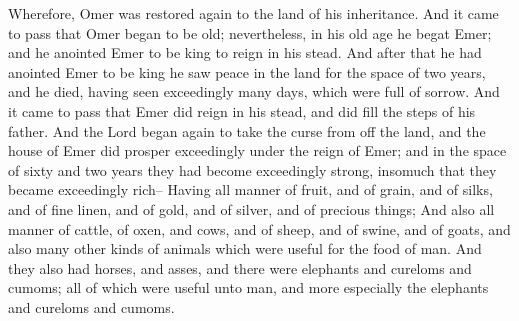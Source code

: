 \bverse \iffalse Wherefore, Omer was restored again to the land of his inheritance. \fi
Wherefore, Omer was restored again to the land of his inheritance.
\bverse \iffalse And it came to pass that Omer began to be old; nevertheless, in his old age he begat Emer; and he anointed Emer to be king to reign in his stead. \fi
And it came to pass that Omer began to be old; nevertheless, in his old age he begat Emer; and he anointed Emer to be king to reign in his stead.
\bverse \iffalse And after that he had anointed Emer to be king he saw peace in the land for the space of two years, and he died, having seen exceedingly many days, which were full of sorrow. And it came to pass that Emer did reign in his stead, and did fill the steps of his father. \fi
And after that he had anointed Emer to be king he saw peace in the land for the space of two years, and he died, having seen exceedingly many days, which were full of sorrow. And it came to pass that Emer did reign in his stead, and did fill the steps of his father.
\bverse \iffalse And the Lord began again to take the curse from off the land, and the house of Emer did prosper exceedingly under the reign of Emer; and in the space of sixty and two years they had become exceedingly strong, insomuch that they became exceedingly rich-- \fi
And the Lord began again to take the curse from off the land, and the house of Emer did prosper exceedingly under the reign of Emer; and in the space of sixty and two years they had become exceedingly strong, insomuch that they became exceedingly rich--
\bverse \iffalse Having all manner of fruit, and of grain, and of silks, and of fine linen, and of gold, and of silver, and of precious things; \fi
Having all manner of fruit, and of grain, and of silks, and of fine linen, and of gold, and of silver, and of precious things;
\bverse \iffalse And also all manner of cattle, of oxen, and cows, and of sheep, and of swine, and of goats, and also many other kinds of animals which were useful for the food of man. \fi
And also all manner of cattle, of oxen, and cows, and of sheep, and of swine, and of goats, and also many other kinds of animals which were useful for the food of man.
\bverse \iffalse And they also had horses, and asses, and there were elephants and cureloms and cumoms; all of which were useful unto man, and more especially the elephants and cureloms and cumoms. \fi
And they also had horses, and asses, and there were elephants and cureloms and cumoms; all of which were useful unto man, and more especially the elephants and cureloms and cumoms.
